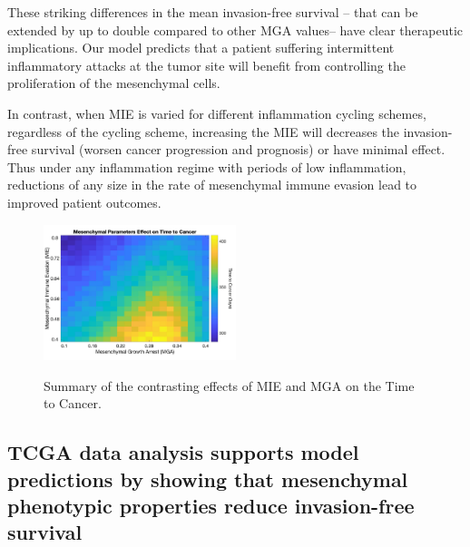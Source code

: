 \documentclass[11pt]{article}
\begin{document}
\par
These striking differences in the mean invasion-free survival -- that can be extended by up to double compared to other MGA values-- have clear therapeutic implications. 
Our model predicts that a patient suffering intermittent inflammatory attacks at the tumor site will benefit from controlling the proliferation of the mesenchymal cells.
\par
In contrast, when MIE is varied for different inflammation cycling schemes, regardless of the cycling scheme, increasing the MIE will decreases the invasion-free survival (worsen cancer progression and prognosis) or have minimal effect. Thus under any inflammation regime with periods of low inflammation, reductions of any size in the rate of mesenchymal immune evasion lead to improved patient outcomes.

\begin{figure}
\center
{\includegraphics[width=0.5\textwidth]{Figure5/heatmap2.jpg}}
\caption{Summary of the contrasting effects of MIE and MGA on the Time to Cancer.
}
\label{fig:MIEvsMGA}
\end{figure}

\subsection{TCGA data analysis supports model predictions by showing that mesenchymal phenotypic properties reduce invasion-free survival }\label{tcga}
\end{document}

